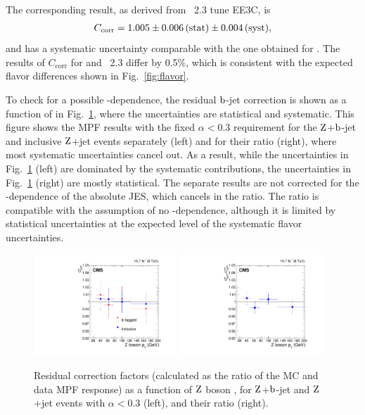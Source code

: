 \documentclass[11pt,twoside,a4paper,cmspaper,final,collab]{cms-tdr}
\begin{document}
The corresponding result, as derived from \HERWIGpp~2.3 tune EE3C, is
\begin{eqnarray}
C_\text{corr} = 1.005 \pm 0.006 \,\text{(stat)} \pm 0.004 \,\text{(syst)},
\end{eqnarray}
and has a systematic uncertainty comparable with the one obtained for . The results of $C_\text{corr}$ for  and \HERWIGpp~2.3 differ by 0.5\%, which is consistent with the expected flavor differences shown in Fig.~\ref{fig:flavor}.

To check for a possible \pt-dependence, the residual $\mathrm{b}$-jet correction is shown as a function of \pt in Fig.~\ref{fig:zbpt}, where the uncertainties are statistical and systematic. This figure shows the MPF results with the fixed $\alpha<0.3$ requirement for the $\mathrm{Z}$+$\mathrm{b}$-jet and inclusive $\mathrm{Z}$+jet events separately (left) and for their ratio (right), where most systematic uncertainties cancel out. As a result, while the uncertainties in Fig.~\ref{fig:zbpt} (left) are dominated by the systematic contributions, the uncertainties in Fig.~\ref{fig:zbpt} (right) are mostly statistical. The separate results are not corrected for the \pt-dependence of the absolute JES, which cancels in the ratio. The ratio is compatible with the assumption of no \pt-dependence, although it is limited by statistical uncertainties at the expected level of the systematic flavor uncertainties.

\begin{figure}[htbp!]
\centering
\includegraphics[width=0.48\textwidth]{Figure_034-a.pdf}
\includegraphics[width=0.48\textwidth]{Figure_034-b.pdf}
\caption{\label{fig:zbpt}
Residual correction factors (calculated as the ratio of the MC and data MPF response) as a function of $\mathrm{Z}$ boson \pt, for $\mathrm{Z}$+$\mathrm{b}$-jet and $\mathrm{Z}$+jet events with $\alpha<0.3$ (left), and their ratio (right).
}
\end{figure}
\end{document}
